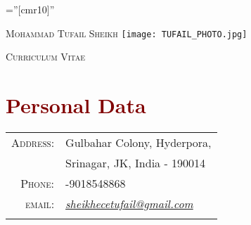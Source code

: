 \documentclass[a4paper,11pt]{article}
\begin{document}
\small

\pagestyle{empty} %

\font\fb=''[cmr10]'' %

\par{\Huge \textsc{ Mohammad Tufail Sheikh} 
\hfill \texttt{[image: TUFAIL\_PHOTO.jpg]} }
\vspace{3mm}
\begin{center} {\LARGE{ \textsc{ Curriculum Vitae}}}\\\vspace{3mm}
 \end{center}

\section{\textcolor{Maroon}{Personal Data}}
\vspace{3mm}
\begin{tabular}{rl}
    \textsc{Address:}   &\normalsize{Gulbahar Colony, Hyderpora,}\\\vspace{2mm}& \normalsize{Srinagar, JK, India - 190014} \\\vspace{1mm}
    \textsc{Phone:}     & \+91-9018548868\\ \vspace{1mm}
    \textsc{email:}     &  \href{mailto:sheikhecetufail@gmail.com}{\emph{\Large sheikhecetufail@gmail.com}} \\\vspace{1mm}
\end{tabular}
\end{document}
